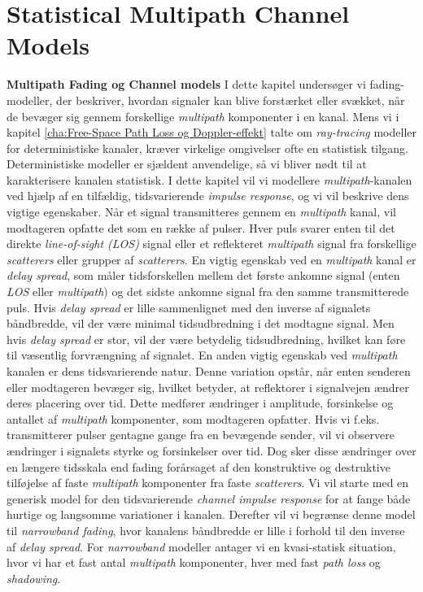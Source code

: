 \documentclass[a4paper,12pt]{book}
\begin{document}
	\chapter{Statistical Multipath Channel Models}
	\textbf{Multipath Fading og Channel models}
	\newline\noindent
	I dette kapitel undersøger vi fading-modeller, der beskriver, hvordan signaler kan blive forstærket eller svækket, når de bevæger sig gennem forskellige \textit{multipath} komponenter i en kanal. Mens vi i kapitel \ref{cha:Free-Space Path Loss og Doppler-effekt} talte om \textit{ray-tracing} modeller for deterministiske kanaler, kræver virkelige omgivelser ofte en statistisk tilgang. Deterministiske modeller er sjældent anvendelige, så vi bliver nødt til at karakterisere kanalen statistisk. I dette kapitel vil vi modellere \textit{multipath}-kanalen ved hjælp af en tilfældig, tidsvarierende \textit{impulse response}, og vi vil beskrive dens vigtige egenskaber.
	\newline\newline
	Når et signal transmitteres gennem en \textit{multipath} kanal, vil modtageren opfatte det som en række af pulser. Hver puls svarer enten til det direkte \textit{line-of-sight (LOS)} signal eller et reflekteret \textit{multipath} signal fra forskellige \textit{scatterers} eller grupper af \textit{scatterers}. En vigtig egenskab ved en \textit{multipath} kanal er \textit{delay spread}, som måler tidsforskellen mellem det første ankomne signal (enten \textit{LOS} eller \textit{multipath}) og det sidste ankomne signal fra den samme transmitterede puls. Hvis \textit{delay spread} er lille sammenlignet med den inverse af signalets båndbredde, vil der være minimal tidsudbredning i det modtagne signal. Men hvis \textit{delay spread} er stor, vil der være betydelig tidsudbredning, hvilket kan føre til væsentlig forvrængning af signalet.
	\newline\newline
	En anden vigtig egenskab ved \textit{multipath} kanalen er dens tidsvarierende natur. Denne variation opstår, når enten senderen eller modtageren bevæger sig, hvilket betyder, at reflektorer i signalvejen ændrer deres placering over tid. Dette medfører ændringer i amplitude, forsinkelse og antallet af \textit{multipath} komponenter, som modtageren opfatter. Hvis vi f.eks. transmitterer pulser gentagne gange fra en bevægende sender, vil vi observere ændringer i signalets styrke og forsinkelser over tid. Dog sker disse ændringer over en længere tidsskala end fading forårsaget af den konstruktive og destruktive tilføjelse af faste \textit{multipath} komponenter fra faste \textit{scatterers}.
	\newline\newline
	Vi vil starte med en generisk model for den tidsvarierende \textit{channel impulse response} for at fange både hurtige og langsomme variationer i kanalen. Derefter vil vi begrænse denne model til \textit{narrowband fading}, hvor kanalens båndbredde er lille i forhold til den inverse af \textit{delay spread}. For \textit{narrowband} modeller antager vi en kvasi-statisk situation, hvor vi har et fast antal \textit{multipath} komponenter, hver med fast \textit{path loss} og \textit{shadowing}. 
	
\end{document}
